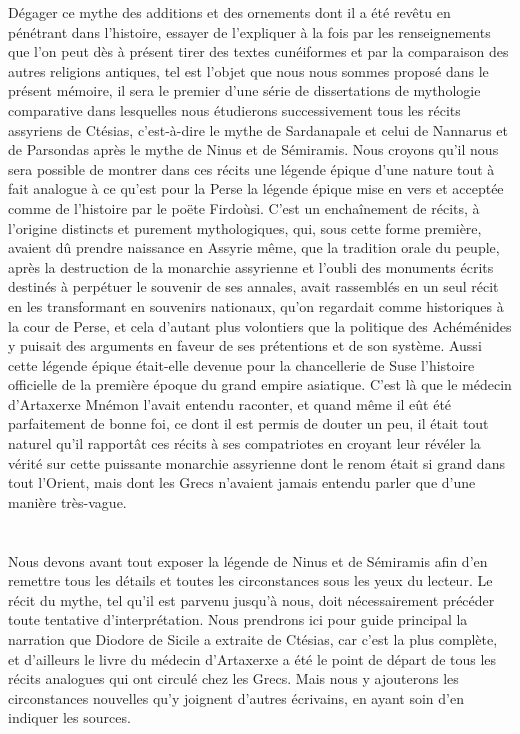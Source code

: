 \documentclass[a4paper, 11pt, oneside, landscape]{article}
\begin{document}
Dégager ce mythe des additions et des ornements dont il a été revêtu en pénétrant dans l'histoire, essayer de l'expliquer à la fois par les renseignements que l'on peut dès à présent tirer des textes cunéiformes et par la comparaison des autres religions antiques, tel est l'objet que nous nous sommes proposé dans le présent mémoire, il sera le premier d'une série de dissertations de mythologie comparative dans lesquelles nous étudierons successivement tous les récits assyriens de Ctésias, c'est-à-dire le mythe de Sardanapale et celui de Nannarus et de Parsondas après le mythe de Ninus et de Sémiramis. Nous croyons qu'il nous sera possible de montrer dans ces récits une légende épique d'une nature tout à fait analogue à ce qu'est pour la Perse la légende épique mise en vers et acceptée comme de l'histoire par le poëte Firdoùsi. C'est un enchaînement de récits, à l'origine distincts et purement mythologiques, qui, sous cette forme première, avaient dû prendre naissance en Assyrie même, que la tradition orale du peuple, après la destruction de la monarchie assyrienne et l'oubli des monuments écrits destinés à perpétuer le souvenir de ses annales, avait rassemblés en un seul récit en les transformant en souvenirs nationaux, qu'on regardait comme historiques à la cour de Perse, et cela d'autant plus volontiers que la politique des Achéménides y puisait des arguments en faveur de ses prétentions et de son système. Aussi cette légende épique était-elle devenue pour la chancellerie de Suse l'histoire officielle de la première époque du grand empire asiatique. C'est là que le médecin d'Artaxerxe Mnémon l'avait entendu raconter, et quand même il eût été parfaitement de bonne foi, ce dont il est permis de douter un peu, il était tout naturel qu'il rapportât ces récits à ses compatriotes en croyant leur révéler la vérité sur cette puissante monarchie assyrienne dont le renom était si grand dans tout l'Orient, mais dont les Grecs n'avaient jamais entendu parler que d'une manière très-vague.

\clearpage
\section{}
\paragraph{}
Nous devons avant tout exposer la légende de Ninus et de Sémiramis afin d'en remettre tous les détails et toutes les circonstances sous les yeux du lecteur. Le récit du mythe, tel qu'il est parvenu jusqu'à nous, doit nécessairement précéder toute tentative d'interprétation. Nous prendrons ici pour guide principal la narration que Diodore de Sicile a extraite de Ctésias, car c'est la plus complète, et d'ailleurs le livre du médecin d'Artaxerxe a été le point de départ de tous les récits analogues qui ont circulé chez les Grecs. Mais nous y ajouterons les circonstances nouvelles qu'y joignent d'autres écrivains, en ayant soin d'en indiquer les sources.
\end{document}
